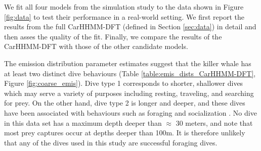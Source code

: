 



We fit all four models from the simulation study to the data shown in Figure \ref{fig:data} to test their performance in a real-world setting. We first report the results from the full CarHHMM-DFT (defined in Section \ref{sec:data}) in detail and then asses the quality of the fit. Finally, we compare the results of the CarHHMM-DFT with those of the other candidate models.

The emission distribution parameter estimates suggest that the killer whale has at least two distinct dive behaviours (Table \ref{table:emis_dists_CarHHMM-DFT}, Figure \ref{fig:coarse_emis}). 
Dive type 1 corresponds to shorter, shallower dives which may serve a variety of purposes including resting, traveling, and searching for prey.
On the other hand, dive type 2 is longer and deeper, and these dives have been associated with behaviours such as foraging and socialization \citep{Tennessen:2019b}. No dive in this data set has a maximum depth deeper than $\approx$ 30 meters, and \citet{Wright:2017} note that most prey captures occur at depths deeper than 100m. It is therefore unlikely that any of the dives used in this study are successful foraging dives.

